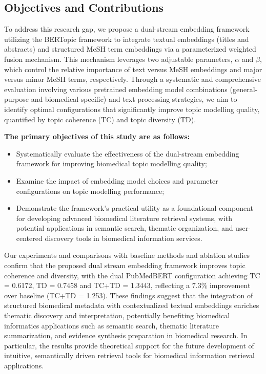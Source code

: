 \documentclass[authorproof,JACIII,researchpaper]{fujipressarticle}
\begin{document}
\subsection{Objectives and Contributions}
To address this research gap, we propose a dual-stream embedding framework utilizing the BERTopic framework to integrate textual embeddings (titles and abstracts) and structured MeSH term embeddings via a parameterized weighted fusion mechanism. This mechanism leverages two adjustable parameters, $\alpha$ and $\beta$, which control the relative importance of text versus MeSH embeddings and major versus minor MeSH terms, respectively. Through a systematic and comprehensive evaluation involving various pretrained embedding model combinations (general-purpose and biomedical-specific) and text processing strategies, we aim to identify optimal configurations that significantly improve topic modelling quality, quantified by topic coherence (TC) and topic diversity (TD).

\noindent\textbf{The primary objectives of this study are as follows:}
\begin{itemize}
\item Systematically evaluate the effectiveness of the dual-stream embedding framework for improving biomedical topic modelling quality;
\item Examine the impact of embedding model choices and parameter configurations on topic modelling performance;
\item Demonstrate the framework's practical utility as a foundational component for developing advanced biomedical literature retrieval systems, with potential applications in semantic search, thematic organization, and user-centered discovery tools in biomedical information services.
\end{itemize}
Our experiments and comparisons with baseline methods and ablation studies confirm that the proposed dual stream embedding framework improves topic coherence and diversity, with the dual PubMedBERT configuration achieving TC = 0.6172, TD = 0.7458 and TC+TD = 1.3443, reflecting a 7.3\% improvement over baseline (TC+TD = 1.253). These findings suggest that the integration of structured biomedical metadata with contextualized textual embeddings enriches thematic discovery and interpretation, potentially benefiting biomedical informatics applications such as semantic search, thematic literature summarization, and evidence synthesis preparation in biomedical research. In particular, the results provide theoretical support for the future development of intuitive, semantically driven retrieval tools for biomedical information retrieval applications.
\end{document}
